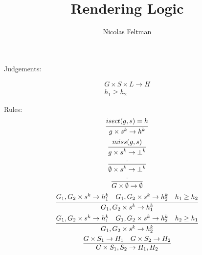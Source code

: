 \documentclass{article}
\title{\Large\textbf{Rendering Logic}}
\author{Nicolas Feltman}
\newcommand {\inferenceSpacing}{\setlength{\jot}{2ex}}
\begin{document}
\maketitle

Judgements:

\begin{gather}
G \times S \times L \to H \\
h_1 \ge h_2
\end{gather}

Rules:
\inferenceSpacing
\begin{gather}
\infer {g \times s^k \to h^k }{isect (g,s) = h} \\
\infer {g \times s^k \to \bot^k }{miss(g,s)} \\
\infer {\emptyset \times s^k \to \bot^k }{\cdot} \\
\infer {G \times \emptyset \to \emptyset }{\cdot} \\
\infer {G_1, G_2 \times s^k \to h_1^k }{G_1, G_2 \times s^k \to h_1^k & G_1, G_2 \times s^k \to h_2^k & h_1 \ge h_2} \\
\infer {G_1, G_2 \times s^k \to h_2^k }{G_1, G_2 \times s^k \to h_1^k & G_1, G_2 \times s^k \to h_2^k & h_2 \ge h_1} \\
\infer {G \times S_1,S_2 \to H_1,H_2 }{G \times S_1 \to H_1 & G \times S_2 \to H_2}
\end{gather}
\end{document}
